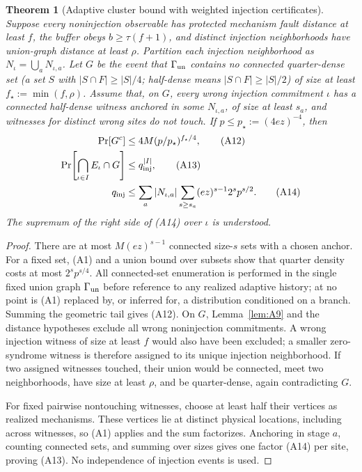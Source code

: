\documentclass[aps,prx,reprint,superscriptaddress,nofootinbib,floatfix,longbibliography]{revtex4-2}
\newtheorem{theorem}{Theorem}[section]
\theoremstyle{definition}
\begin{document}
\begin{theorem}[Adaptive cluster bound with weighted injection certificates]
\label{thm:A11}
Suppose every noninjection observable has protected mechanism fault distance at least $f$, the
buffer obeys $b\geq\tau(f+1)$, and distinct injection neighborhoods have
union-graph distance at least $\rho$.  Partition each injection neighborhood
as $N_\iota=\bigcup_aN_{\iota,a}$.  Let $G$ be the event that
$\Gamma_{\rm un}$ contains no connected quarter-dense set (a set $S$ with $|S\cap F|\ge|S|/4$; \emph{half-dense} means $|S\cap F|\ge|S|/2$) of size at least
$f_\star:=\min(f,\rho)$.  Assume that, on $G$, every wrong injection
commitment $\iota$ has a connected half-dense witness anchored in some
$N_{\iota,a}$, of size at least $s_a$, and witnesses for distinct wrong sites
do not touch.  If $p\leq p_\star:=(4ez)^{-4}$, then
\begin{align}
 \Pr[G^c]&\leq4M(p/p_\star)^{f_\star/4},                            \tag{A12}\\
 \Pr\!\left[\bigcap_{\iota\in I}E_\iota\cap G\right]
 &\leq q_{\rm inj}^{|I|},                                                    \tag{A13}\\
 q_{\rm inj}&\leq \sum_a |N_{\iota,a}|
       \sum_{s\geq s_a}(ez)^{s-1}2^sp^{s/2}.                        \tag{A14}
\end{align}
The supremum of the right side of (A14) over $\iota$ is understood.
\end{theorem}
\begin{proof}
There are at most $M(ez)^{s-1}$ connected size-$s$ sets with a chosen anchor.
For a fixed set, (A1) and a union bound over subsets show that quarter density
costs at most $2^sp^{s/4}$.  All connected-set enumeration is performed in the
single fixed union graph $\Gamma_{\rm un}$ before reference to any realized
adaptive history; at no point is (A1) replaced by, or inferred for, a distribution
conditioned on a branch.  Summing the geometric tail gives (A12).  On $G$,
Lemma~\ref{lem:A9} and the distance hypotheses exclude all wrong noninjection
commitments.  A wrong injection witness of size at least $f$ would also have
been excluded; a smaller zero-syndrome witness is therefore assigned to its
unique injection neighborhood.  If two assigned witnesses touched, their
union would be connected, meet two neighborhoods, have size at least $\rho$,
and be quarter-dense, again contradicting $G$.

For fixed pairwise nontouching witnesses, choose at least half their vertices
as realized mechanisms.  These vertices lie at distinct physical locations,
including across witnesses, so (A1) applies and the sum factorizes.  Anchoring
in stage $a$, counting connected sets, and summing over sizes gives one factor
(A14) per site, proving (A13).  No independence of injection events is used.
\end{proof}
\end{document}
